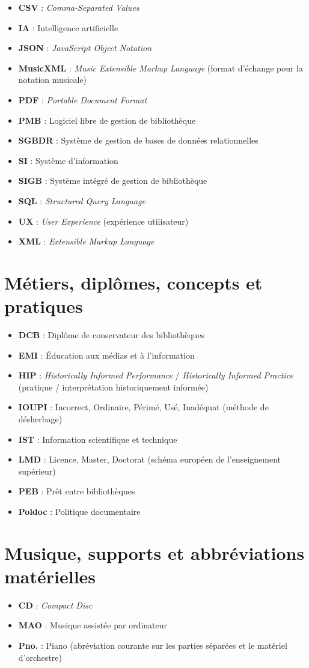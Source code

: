 \begin{itemize}
	\item \textbf{CSV} : \textit{Comma-Separated Values}
	\item \textbf{IA} : Intelligence artificielle
	\item \textbf{JSON} : \textit{JavaScript Object Notation}
	\item \textbf{MusicXML} : \textit{Music Extensible Markup Language} (format d'échange pour la notation musicale)
	\item \textbf{PDF} : \textit{Portable Document Format}
	\item \textbf{PMB} : Logiciel libre de gestion de bibliothèque
	\item \textbf{SGBDR} : Système de gestion de bases de données relationnelles
	\item \textbf{SI} : Système d'information
	\item \textbf{SIGB} : Système intégré de gestion de bibliothèque
	\item \textbf{SQL} : \textit{Structured Query Language}
	\item \textbf{UX} : \textit{User Experience} (expérience utilisateur)
	\item \textbf{XML} : \textit{Extensible Markup Language}
\end{itemize}

\section*{Métiers, diplômes, concepts et pratiques}

\begin{itemize}
	\item \textbf{DCB} : Diplôme de conservateur des bibliothèques
	\item \textbf{EMI} : Éducation aux médias et à l'information
	\item \textbf{HIP} : \textit{Historically Informed Performance} / \textit{Historically Informed Practice} (pratique / interprétation historiquement informée)
	\item \textbf{IOUPI} : Incorrect, Ordinaire, Périmé, Usé, Inadéquat (méthode de désherbage)
	\item \textbf{IST} : Information scientifique et technique
	\item \textbf{LMD} : Licence, Master, Doctorat (schéma européen de l'enseignement supérieur)
	\item \textbf{PEB} : Prêt entre bibliothèques
	\item \textbf{Poldoc} : Politique documentaire 
\end{itemize}

\section*{Musique, supports et abbréviations matérielles}

\begin{itemize}
	\item \textbf{CD} : \textit{Compact Disc}
	\item \textbf{MAO} : Musique assistée par ordinateur
	\item \textbf{Pno.} : Piano (abréviation courante sur les parties séparées et le matériel d'orchestre)
\end{itemize}